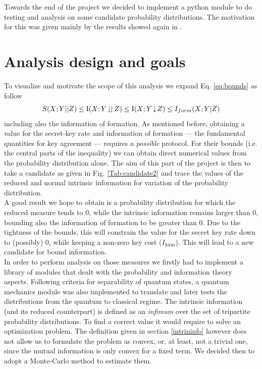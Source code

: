 \label{ch:six}
Towards the end of the project we decided to implement a python module to do testing and analysis on some candidate probability distributions. The motivation for this was given mainly by the results showed again in \cite{RW03}. 
\section{Analysis design and goals}
    To visualize and motivate the scope of this analysis we expand Eq. \ref{eq:bounds} as follow
    \begin{equation}
    	S(X;Y||Z) \leq \operatorname{I}(X;Y\!\downdownarrows\!Z) \leq \operatorname{I}(X;Y\!\downarrow\!Z) \leq I_{form} (X;Y|Z)
    \end{equation}
    including also the information of formation.
    As mentioned before, obtaining a value for the secret-key rate and information of formation --- the fundamental quantities for key agreement --- requires a \textit{possible} protocol. 
    For their bounds (i.e. the central parts of the inequality) we can obtain direct numerical values from the probability distribution alone. 
    The aim of this part of the project is then to take a candidate as given in Fig. \ref{Tab:candidate2} and trace the values of the reduced and normal intrinsic information for  variation of the probability distribution.\\
    
    A good result we hope to obtain is a probability distribution for which the reduced measure tends to $0$, while the intrinsic information remains larger than $0$, bounding also the information of formation to be greater than $0$. 
    Due to the tightness of the bounds, this will constrain the value for the secret key rate down to (possibly) $0$, while keeping a non-zero key cost ($I_{\text{form}}$).
    This will lead to a new candidate for bound information.\\
    
    In order to perform analysis on those measures we firstly had to implement a library of modules that dealt with the probability and information theory aspects.
    Following criteria for separability of quantum states, a quantum mechanics module was also implemented to translate and later tests the distributions from the quantum to classical regime.
    The intrinsic information (and its reduced counterpart) is defined as an \emph{infimum} over the set of tripartite probability distributions. 
    To find a correct value it would require to solve an optimization problem. 
    The definition given in section \ref{intrininfo} however does not allow us to formulate the problem as convex, or, at least, not a trivial one, since the mutual information is only convex for a fixed term.
    We decided then to adopt a Monte-Carlo method to estimate them.
     
